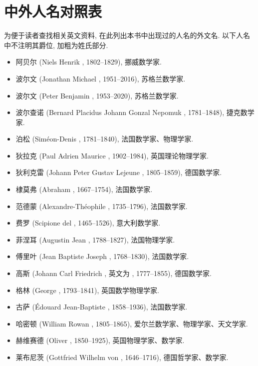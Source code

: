 \chapter{中外人名对照表}

为便于读者查找相关英文资料, 在此列出本书中出现过的人名的外文名.
以下人名中不注明其爵位, 加粗为姓氏部分.

\begin{itemize}
  \item 阿贝尔 (Niels Henrik , 1802--1829), 挪威数学家.
  \item 波尔文 (Jonathan Michael , 1951--2016), 苏格兰数学家.
  \item 波尔文 (Peter Benjamin , 1953--2020), 苏格兰数学家.
  \item 波尔查诺 (Bernard Placidus Johann Gonzal Nepomuk , 1781--1848), 捷克数学家.
  \item 泊松 (Siméon-Denis , 1781--1840), 法国数学家、物理学家.
  \item 狄拉克 (Paul Adrien Maurice , 1902--1984), 英国理论物理学家.
  \item 狄利克雷 (Johann Peter Gustav Lejeune , 1805--1859), 德国数学家.
  \item 棣莫弗 (Abraham , 1667--1754), 法国数学家.
  \item 范德蒙 (Alexandre-Théophile , 1735--1796), 法国数学家.
  \item 费罗 (Scipione del , 1465--1526), 意大利数学家.
  \item 菲涅耳 (Augustin Jean , 1788--1827), 法国物理学家.
  \item 傅里叶 (Jean Baptiste Joseph , 1768--1830), 法国数学家.
  \item 高斯 (Johann Carl Friedrich , 英文为 , 1777--1855), 德国数学家.
  \item 格林 (George , 1793--1841), 英国数学物理学家.
  \item 古萨 (Édouard Jean-Baptiste , 1858--1936), 法国数学家.
  \item 哈密顿 (William Rowan , 1805--1865), 爱尔兰数学家、物理学家、天文学家.
  \item 赫维赛德 (Oliver , 1850--1925), 英国物理学家、数学家.
  \item 莱布尼茨 (Gottfried Wilhelm von , 1646--1716), 德国哲学家、数学家.

\end{itemize}
